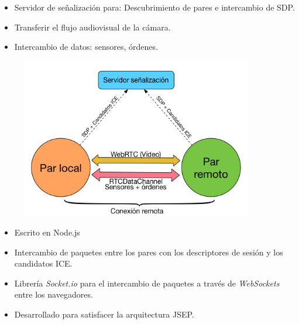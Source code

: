 \documentclass[notes,slidesec,a4]{seminar}
\begin{document}

\begin{hslide}
\begin{minipage}[t]{0.6\textwidth}
\begin{itemize}
\item Servidor de señalización para: Descubrimiento de pares e intercambio de SDP.
\item Transferir el flujo audiovisual de la cámara.
\item Intercambio de datos: sensores, órdenes.
\end{itemize}

\end{minipage}
\begin{minipage}[t]{0.6\textwidth}
\begin{center}
\begin{figure}
\includegraphics[width=0.9\textwidth]{img/conexionremota}
\end{figure}
\end{center}
\end{minipage}

\end{hslide}



\begin{hslide}
\begin{itemize}
\item Escrito en Node.js
\item Intercambio de paquetes entre los pares con los descriptores de sesión y los candidatos ICE.
\item Librería \emph{Socket.io} para el intercambio de paquetes a través de \emph{WebSockets} entre los navegadores.
\item Desarrollado para satisfacer la arquitectura JSEP.
\end{itemize}
\end{hslide}
\end{document}

